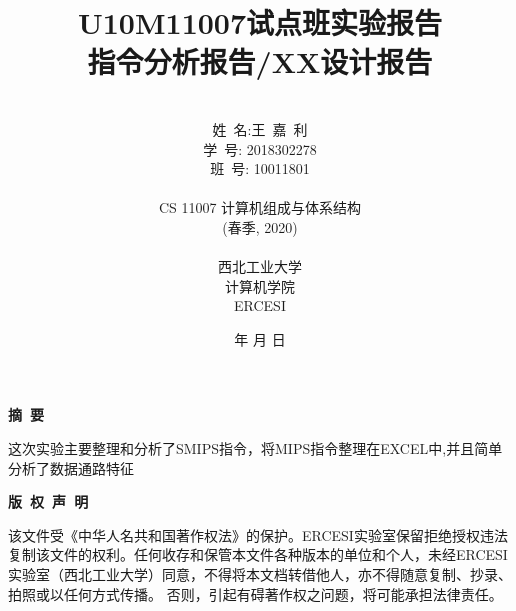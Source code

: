 \documentclass[UTF8]{ctexart}
\begin{document}
\renewcommand{\contentsname}{目\ 录}
\renewcommand{\appendixname}{附录}
\renewcommand{\refname}{参考文献} 
\renewcommand{\figurename}{图}
\renewcommand{\tablename}{表}
\renewcommand{\today}{\number\year 年 \number\month 月 \number\day 日}

\title{{\Huge U10M11007试点班实验报告{\large\linebreak\\}}{\Large 指令分析报告/XX设计报告\linebreak\linebreak}}
\author{\\姓\ 名:王\ 嘉\ 利\\
学\ 号: 2018302278\\
班\ 号: 10011801\\\\
CS 11007 计算机组成与体系结构\\
(春季, 2020)\\\\
西北工业大学\\
计算机学院\\
ERCESI}
\date{\today}
\maketitle
\newpage

\begin{center}
{\Large\bf{摘\ 要\\}}
\end{center}
这次实验主要整理和分析了SMIPS指令，将MIPS指令整理在EXCEL中,并且简单分析了数据通路特征
\newpage
\begin{center}
{\Large\bf{版\ 权\ 声\ 明\\}}
\end{center}
该文件受《中华人名共和国著作权法》的保护。ERCESI实验室保留拒绝授权违法复制该文件的权利。任何收存和保管本文件各种版本的单位和个人，未经ERCESI实验室（西北工业大学）同意，不得将本文档转借他人，亦不得随意复制、抄录、拍照或以任何方式传播。 否则，引起有碍著作权之问题，将可能承担法律责任。\newpage
\begin{center}
\tableofcontents\label{c}
\end{center}
\newpage
\end{document}
